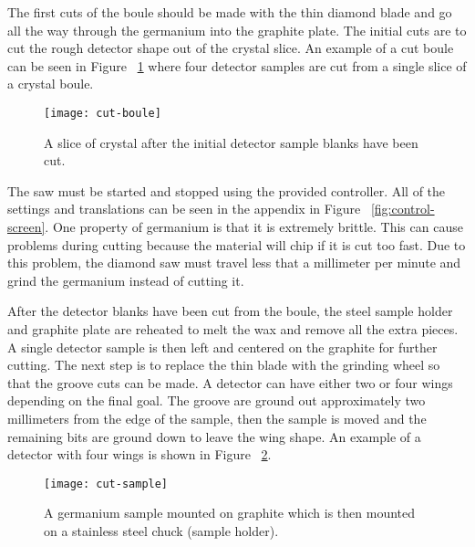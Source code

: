 The first cuts of the boule should be made with the thin diamond blade and go all the way through the germanium into the graphite plate.
The initial cuts are to cut the rough detector shape out of the crystal slice.
An example of a cut boule can be seen in Figure ~\ref{fig:cutboule} where four detector samples are cut from a single slice of a crystal boule.
\begin{figure}[htpb]
\centering
\texttt{[image: cut-boule]}
\caption{A slice of crystal after the initial detector sample blanks have been cut.}
\label{fig:cutboule}
\end{figure}
The saw must be started and stopped using the provided controller.
All of the settings and translations can be seen in the appendix in Figure ~\ref{fig:control-screen}.
One property of germanium is that it is extremely brittle.
This can cause problems during cutting because the material will chip if it is cut too fast.
Due to this problem, the diamond saw must travel less that a millimeter per minute and grind the germanium instead of cutting it.

After the detector blanks have been cut from the boule, the steel sample holder and graphite plate are reheated to melt the wax and remove all the extra pieces.
A single detector sample is then left and centered on the graphite for further cutting.
The next step is to replace the thin blade with the grinding wheel so that the groove cuts can be made.
A detector can have either two or four wings depending on the final goal.
The groove are ground out approximately two millimeters from the edge of the sample, then the sample is moved and the remaining bits are ground down to leave the wing shape.
An example of a detector with four wings is shown in Figure ~\ref{fig:cut-sample}.
\begin{figure}[htpb]
\centering
\texttt{[image: cut-sample]}
  \caption{A germanium sample mounted on graphite which is then mounted on a stainless steel chuck (sample holder).}
\label{fig:cut-sample}
\end{figure}


